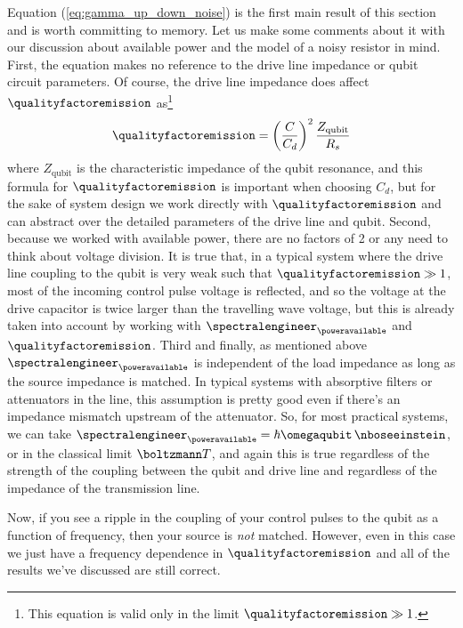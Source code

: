 
Equation (\ref{eq:gamma_up_down_noise}) is the first main result of this section and is worth committing to memory.
Let us make some comments about it with our discussion about available power and the model of a noisy resistor in mind.
First, the equation makes no reference to the drive line impedance or qubit circuit parameters.
Of course, the drive line impedance does affect $\qualityfactoremission$ as\footnote{This equation is valid only in the limit $\qualityfactoremission \gg 1$.}
\begin{equation}
  \qualityfactoremission = \left( \frac{C}{C_d} \right)^2 \frac{Z_\text{qubit}}{R_s}
\end{equation}
where $Z_\text{qubit}$ is the characteristic impedance of the qubit resonance, and this formula for $\qualityfactoremission$ is important when choosing $C_d$, but for the sake of system design we work directly with $\qualityfactoremission$ and can abstract over the detailed parameters of the drive line and qubit.
Second, because we worked with available power, there are no factors of 2 or any need to think about voltage division.
It is true that, in a typical system where the drive line coupling to the qubit is very weak such that $\qualityfactoremission \gg 1$, most of the incoming control pulse voltage is reflected, and so the voltage at the drive capacitor is twice larger than the travelling wave voltage, but this is already taken into account by working with $\spectralengineer_{\poweravailable}$ and $\qualityfactoremission$.
Third and finally, as mentioned above $\spectralengineer_{\poweravailable}$ is independent of the load impedance as long as the source impedance is matched.
In typical systems with absorptive filters or attenuators in the line, this assumption is pretty good even if there's an impedance mismatch upstream of the attenuator.
So, for most practical systems, we can take $\spectralengineer_{\poweravailable} = \hbar \omegaqubit \, \nboseeinstein$, or in the classical limit $\boltzmann T$, and again this is true regardless of the strength of the coupling between the qubit and drive line and regardless of the impedance of the transmission line.

Now, if you see a ripple in the coupling of your control pulses to the qubit as a function of frequency, then your source is \emph{not} matched.
However, even in this case we just have a frequency dependence in $\qualityfactoremission$ and all of the results we've discussed are still correct.


